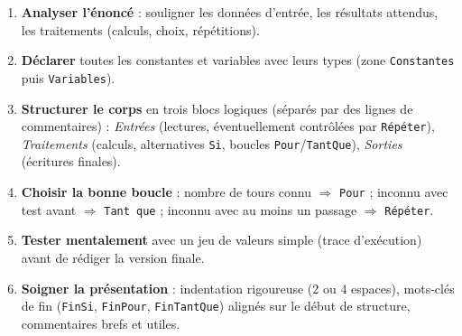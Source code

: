 \documentclass[11pt]{article}
\begin{document}
\begin{methode}
\begin{enumerate}
\item \textbf{Analyser l'énoncé} : souligner les données d'entrée, les résultats attendus, les traitements (calculs, choix, répétitions).
\item \textbf{Déclarer} toutes les constantes et variables avec leurs types (zone \texttt{Constantes} puis \texttt{Variables}).
\item \textbf{Structurer le corps} en trois blocs logiques (séparés par des lignes de commentaires) : \emph{Entrées} (lectures, éventuellement contrôlées par \texttt{Répéter}), \emph{Traitements} (calculs, alternatives \texttt{Si}, boucles \texttt{Pour}/\texttt{TantQue}), \emph{Sorties} (écritures finales).
\item \textbf{Choisir la bonne boucle} : nombre de tours connu $\Rightarrow$ \texttt{Pour} ; inconnu avec test avant $\Rightarrow$ \texttt{Tant que} ; inconnu avec au moins un passage $\Rightarrow$ \texttt{Répéter}.
\item \textbf{Tester mentalement} avec un jeu de valeurs simple (trace d'exécution) avant de rédiger la version finale.
\item \textbf{Soigner la présentation} : indentation rigoureuse (2 ou 4 espaces), mots-clés de fin (\texttt{FinSi}, \texttt{FinPour}, \texttt{FinTantQue}) alignés sur le début de structure, commentaires brefs et utiles.
\end{enumerate}
\end{methode}
\end{document}
